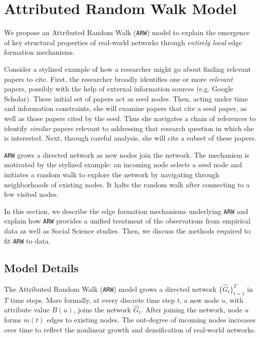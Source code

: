 \vspace{-6pt}
\section{Attributed Random Walk Model}
\label{sec:Proposed Model}
We propose an Attributed Random Walk (\texttt{ARW}) model to explain the emergence
of key structural properties of real-world networks through \textit{entirely local}
edge formation mechanisms.

Consider a stylized example of how a researcher might go about finding relevant papers to cite. First, the researcher broadly identifies one or more \textit{relevant} papers,
possibly with the help of external information sources (e.g. Google Scholar). These initial set of papers act as seed nodes.  Then, acting under time and information constraints, she will examine papers that cite a seed paper, as well as those papers cited by the seed. Thus she navigates a chain of references to identify \textit{similar} papers relevant to addressing that research question in which she is interested. Next, through careful analysis, she will cite a subset of these papers.

\texttt{ARW} grows a directed network as new nodes join the network. The
mechanism is motivated by the stylized example: an incoming node selects a seed node and initiates a random walk to explore the network by navigating through neighborhoods of existing nodes. It halts the random walk after connecting to a few visited nodes.

In this section, we describe the edge formation mechanisms underlying
\texttt{ARW} and explain how \texttt{ARW} provides a unified treatment of
the observations from empirical data as well as Social Science studies. Then,
we discuss the methods required to fit \texttt{ARW} to data.


\subsection{Model Details}
\label{sub:Model Description}


The Attributed Random Walk (\texttt{ARW}) model grows a directed network $\{\hat{G}_t\}^T_{t=1}$
in $T$ time steps.
More formally, at every discrete time step $t$, a
new node $u$, with attribute value $B(u)$, joins the network $\hat{G}_t$.
After joining the network, node $u$ forms $m(t)$ edges to
existing nodes.
The out-degree of incoming nodes increases over time to
reflect the nonlinear growth and densification of real-world networks.

